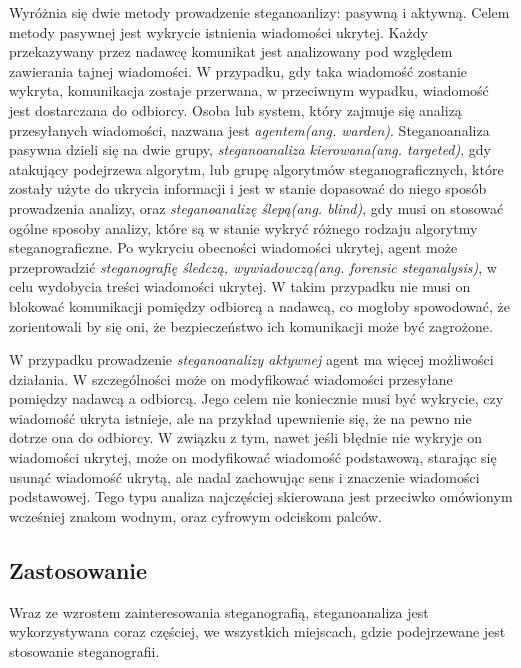 \documentclass[a4paper, twoside]{report}
\begin{document}
        Wyróżnia się dwie metody prowadzenie steganoanlizy: pasywną i aktywną.
        Celem metody pasywnej jest wykrycie istnienia wiadomości ukrytej. Każdy przekazywany
        przez nadawcę komunikat jest analizowany pod względem zawierania tajnej wiadomości.
        W przypadku, gdy taka wiadomość zostanie wykryta, komunikacja zostaje przerwana,
        w przeciwnym wypadku, wiadomość jest dostarczana do odbiorcy. Osoba lub system,
        który zajmuje się analizą przesyłanych wiadomości, nazwana jest \emph{agentem(ang. warden)}.
        Steganoanaliza pasywna dzieli się na dwie grupy, \emph{steganoanaliza kierowana(ang. targeted)}, gdy
        atakujący podejrzewa algorytm, lub grupę algorytmów steganograficznych,
        które zostały użyte do ukrycia informacji i jest w stanie dopasować do
        niego sposób prowadzenia analizy, oraz \emph{steganoanalizę ślepą(ang. blind)},
        gdy musi on stosować ogólne sposoby analizy, które są w stanie wykryć różnego
        rodzaju algorytmy steganograficzne. Po wykryciu obecności wiadomości ukrytej,
        agent może przeprowadzić \emph{steganografię śledczą, wywiadowczą(ang. forensic steganalysis)},
        w celu wydobycia treści wiadomości ukrytej. W takim przypadku nie musi on
        blokować komunikacji pomiędzy odbiorcą a nadawcą, co mogłoby spowodować,
        że zorientowali by się oni, że bezpieczeństwo ich komunikacji może być zagrożone.

        W przypadku prowadzenie \emph{steganoanalizy aktywnej} agent ma więcej możliwości
        działania. W szczególności może on modyfikować wiadomości przesyłane pomiędzy
        nadawcą a odbiorcą. Jego celem nie koniecznie musi być wykrycie, czy wiadomość
        ukryta istnieje, ale na przykład upewnienie się, że na pewno nie dotrze ona
        do odbiorcy. W związku z tym, nawet jeśli błędnie nie wykryje on wiadomości ukrytej,
        może on modyfikować wiadomość podstawową, starając się usunąć wiadomość ukrytą,
        ale nadal zachowując sens i znaczenie wiadomości podstawowej. Tego typu analiza
        najczęściej skierowana jest przeciwko omówionym wcześniej znakom wodnym,
        oraz cyfrowym odciskom palców.\cite[Rozdział 13]{DIGITALWATERMARKING}

        \subsection{Zastosowanie}
        Wraz ze wzrostem zainteresowania steganografią, steganoanaliza jest wykorzystywana
        coraz częściej, we wszystkich miejscach, gdzie podejrzewane jest stosowanie
        steganografii.
\end{document}
